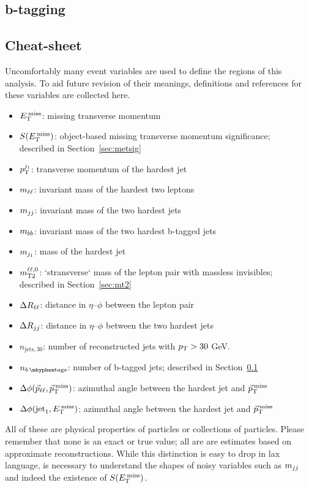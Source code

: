 \subsection{b-tagging}
\label{sec:btagging}

\subsection{Cheat-sheet}
Uncomfortably many event variables are used to define the regions of this
analysis.
To aid future revision of their meanings, definitions and references for these
variables are collected here.
\begin{itemize}
\item $E_\mathrm{T}^\mathrm{\:miss}$: missing transverse momentum
\item $S(E_\mathrm{T}^\mathrm{\:miss})$: object-based missing transverse momentum significance;\\
described in Section~\ref{sec:metsig}
\item $p_\mathrm{T}^{j_1}$: transverse momentum of the hardest jet%
\vspace{0.5em}
\item $m_{\ell\ell}$: invariant mass of the hardest two leptons
\item $m_{jj}$: invariant mass of the two hardest jets
\item $m_{bb}$: invariant mass of the two hardest b-tagged jets
\item $m_{j_1}$: mass of the hardest jet
\item $m_\mathrm{T2}^{\ell\ell,0}$: `stransverse` mass of the lepton pair with massless invisibles;\\
described in Section~\ref{sec:mt2}
\vspace{0.5em}
\item $\Delta R_{\ell\ell}$: distance in $\eta\textrm{--}\phi$ between the lepton pair
\item $\Delta R_{jj}$: distance in $\eta\textrm{--}\phi$ between the two hardest jets%
\vspace{0.5em}
\item $n_{\mathrm{jets},30}$: number of reconstructed jets with $p_\mathrm{T} > 30$ GeV.
\item $\nbtag$: number of b-tagged jets;
described in Section~\ref{sec:btagging}
\vspace{0.5em}
\item $\Delta\phi(\vec p_{\ell\ell}, \vec p_\mathrm{T}^\mathrm{\:miss})$: azimuthal angle between the hardest jet and $\vec p_\mathrm{T}^\mathrm{\:miss}$
\item $\Delta\phi(\mathrm{jet}_1,E_\mathrm{T}^\mathrm{\:miss})$: azimuthal angle between
the hardest jet and $\vec p_\mathrm{T}^\mathrm{\:miss}$
\end{itemize}
All of these are physical properties of particles or collections of particles.
Please remember that none is an exact or true value;
all are are estimates based on approximate reconstructions.
While this distinction is easy to drop in lax language, is necessary to
understand the shapes of noisy variables such as $m_{jj}$ and indeed the
existence of $S(E_\mathrm{T}^\mathrm{\:miss})$.

